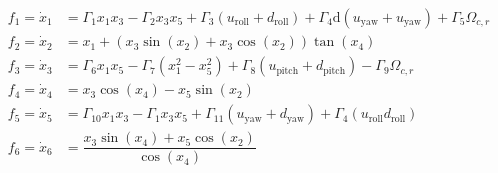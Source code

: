 \documentclass[3p]{elsarticle}
\begin{document}
\begin{align}
    f_1 = \dot{x}_1 &= \Gamma_1 x_1 x_3 - \Gamma_2 x_3 x_5 + \Gamma_3  (u_{\text{roll}} + d_{\text{roll}})
 + \Gamma_4 \mathrm{d} (u_{\text{yaw}} + u_{\text{yaw}}) 
+ \Gamma_5 \Omega_{c, r}  \label{eq:eq_of_motion_start1} \\
    f_2 = \dot{x}_2 &= x_1 + (x_3\sin(x_2) + x_3\cos(x_2))\tan(x_4)  \\
    f_3 = \dot{x}_3 &= \Gamma_6 x_1 x_5 - \Gamma_7 (x_1^2 - x_5^2) + \Gamma_8  (u_{\text{pitch}} + d_{\text{pitch}})- \Gamma_9 \Omega_{c, r} \\
    f_4 = \dot{x}_4 &= x_3\cos(x_4) - x_5\sin(x_2) \\
    f_5 = \dot{x}_5 &= \Gamma_{10} x_1 x_3 - \Gamma_{1} x_3 x_5 + \Gamma_{11} (u_{\text{yaw}} + d_{\text{yaw}}) + \Gamma_{4}(u_{\text{roll}} d_{\text{roll}})\\
    f_6 = \dot{x}_6 &= \dfrac{x_3\sin(x_4) + x_5\cos(x_2)}{\cos(x_4)}~\label{eq:eq_of_motion_end1}
\end{align}


    
\end{document}
